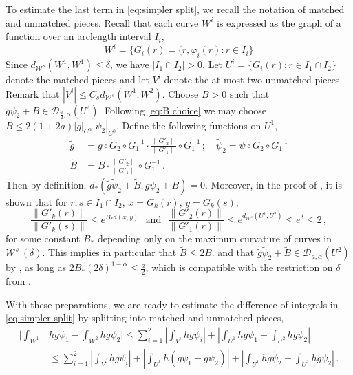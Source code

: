 \documentclass{amsart}
\numberwithin{equation}{section}
\newcommand\cD{{\mathcal D}}
\newcommand\cW{{\mathcal W}}
\newcommand\vf{\varphi}
\newcommand{\tB}{\tilde{B}}
\newcommand{\tg}{\tilde{g}}
\newcommand\tpsi{\tilde{\psi}}
\begin{document}
To estimate the last term in \eqref{eq:simpler split},
we recall the notation of matched and unmatched pieces.
Recall that each curve $W^i$ is expressed as the graph of a function over an arclength interval $I_i$,
\[
W^i = \{ G_i(r) = (r, \vf_i(r) : r \in I_i \}
\]
Since $d_{\cW^s}(W^1, W^1) \le \delta$,  we have $| I_1 \cap I_2 | > 0$.  
Let
$U^i = \{ G_i(r) : r \in I_1 \cap I_2 \}$ denote the matched pieces and let $V^i$ denote the at most two unmatched pieces.
Remark that $|V^i| \le C_s d_{\cW^s}(W^1, W^2)$.
Choose $B >0$ such that $g \psi_2 + B \in \cD_{\frac{a}{2}, \alpha}(U^2)$.  Following \eqref{eq:B choice}
we may choose $B \le 2 (1+2a) |g|_{C^\alpha} |\psi_2|_{C^0}$.
Define the following functions on $U^1$,
\[
\begin{split}
\tg & = g \circ G_2 \circ G_1^{-1} \cdot \frac{\| G'_2 \|}{\| G'_1 \|} \circ G_1^{-1} \, ; \quad
\tpsi_2 = \psi \circ G_2 \circ G_1^{-1} \\
\tB & = B  \cdot \frac{\| G'_2 \|}{\| G'_1 \|} \circ G_1^{-1}  \, .
\end{split}
\]
Then by definition, $d_*(\tg\tpsi_2 + \tB, g\psi_2 + B) = 0$.
Moreover,
in the proof of \cite[Lemma~5.5(c)]{DL22}, it is shown that for $r,s \in I_1 \cap I_2$, $x = G_k(r)$,
$y = G_k(s)$,
\begin{equation}
\label{eq:graph control}
\frac{\| G'_k(r) \|}{\| G'_k(s) \|} \le e^{B_* d(x,y) } \,\, 
\mbox{ and } \,\,
\frac{\| G'_2(r) \|}{\| G'_1(r) \|} \le e^{d_{\cW^s}(U^1, U^2)} \le e^{\delta} \le 2 \, ,
\end{equation}
for some constant $B_*$ depending only on the maximum curvature of curves in
$\cW^s_-(\delta)$.  This implies in particular that
$\tilde B \le 2 B$.
and that $\tg \tpsi_2 + \tilde B \in \cD_{a, \alpha}(U^2)$
by \cite[eq.~(5.31)]{DL22}, as long as $2B_* (2\delta)^{1-\alpha} \le \frac{a}{2}$, which
is compatible with the restriction on $\delta$ from \cite[eq.~(5.32)]{DL22}.

With these preparations, we are ready to estimate the difference of integrals in \eqref{eq:simpler split}
by splitting into matched and unmatched pieces,
\begin{equation}
\label{eq:final split?}
\begin{split}
\Big| \int_{W^1}& hg\psi_1 - \int_{W^2} hg\psi_2 \Big| 
 \le  \sum_{i=1}^2 \left| \int_{V^i} h g \psi_i \right| + \left| \int_{U^1} hg\psi_1 - \int_{U^2} hg\psi_2 \right| \\
& \le  \sum_{i=1}^2 \left| \int_{V^i} h g \psi_i \right|
+ \left| \int_{U^1} h (g \psi_1 - \tg \tpsi_2) \right| 
 + \left| \int_{U^1} h \tg \tpsi_2 - \int_{U^2} h g \psi_2 \right| \, . 
\end{split}
\end{equation}
\end{document}
